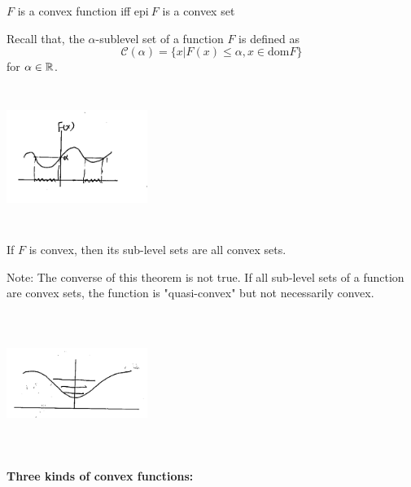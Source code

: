\begin{definition}
	$F$ is a convex function iff $\text{epi}\ F$ is a convex set
\end{definition}

\begin{definition} Recall that, the $\alpha$-sublevel set of a function $F$ is defined as
	$$\mathcal{C}(\alpha) = \{x|F(x)\leq \alpha, x\in \text{dom}F \}$$
	for $\alpha\in\mathbb{R}$.
	\begin{marginfigure}
	\centering
	\includegraphics[width=1.8in,height=1.8in]{figures/ch08/figure1030_12.png}
	\end{marginfigure}
\end{definition}

\begin{theorem}
	If $F$ is convex, then its sub-level sets are all convex sets.
\end{theorem}
Note: The converse of this theorem is not true. If all sub-level sets of a function are convex sets, the function is "quasi-convex" but not necessarily convex.\\

\begin{marginfigure}
	\centering
	\includegraphics[width=1.8in,height=1.8in]{figures/ch08/figure1030_13.png}
\end{marginfigure}

\vspace{0.3cm}
\noindent \textbf{Three kinds of convex functions:}

